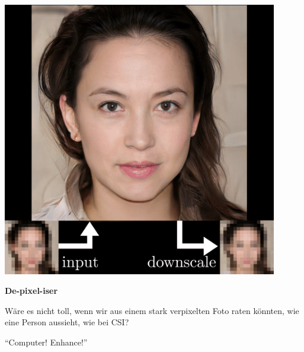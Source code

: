 \documentclass[aspectratio=169,usenames,dvipsnames]{beamer}
\begin{document}
\begin{frame}
\begin{minipage}{.5\textwidth}
\includegraphics[width=0.9\textwidth, keepaspectratio]{images/step11}
\end{minipage}\begin{minipage}{.5\textwidth}
\textbf{De-pixel-iser}
\bigskip

Wäre es nicht toll, wenn wir aus einem stark verpixelten Foto raten könnten, wie eine Person aussieht, wie bei CSI?
\bigskip

``Computer! Enhance!''
\end{minipage}
\end{frame}
\end{document}
